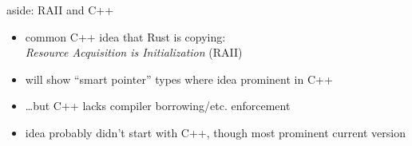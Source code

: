 \begin{frame}{aside: RAII and C++}
    \begin{itemize}
    \item common C++ idea that Rust is copying: \\
        \textit{Resource Acquisition is Initialization} (RAII)
    \item will show ``smart pointer'' types where idea prominent in C++
    \item \ldots but C++ lacks compiler borrowing/etc. enforcement
    \vspace{.5cm}
    \item idea probably didn't start with C++, though most prominent current version
    \end{itemize}
\end{frame}


